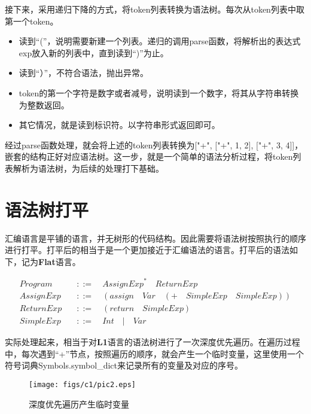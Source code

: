 接下来，采用递归下降的方式，将token列表转换为语法树。每次从token列表中取第一个token。
\begin{itemize}
  \item 读到“(”，说明需要新建一个列表。递归的调用parse函数，将解析出的表达式exp放入新的列表中，直到读到“)”为止。
  \item 读到“）”，不符合语法，抛出异常。
  \item token的第一个字符是数字或者减号，说明读到一个数字，将其从字符串转换为整数返回。
  \item 其它情况，就是读到标识符。以字符串形式返回即可。
\end{itemize}

经过parse函数处理，就会将上述的token列表转换为["+", ["+", 1, 2], ["+", 3, 4]]，嵌套的结构正好对应语法树。这一步，就是一个简单的语法分析过程，将token列表解析为语法树，为后续的处理打下基础。

\section{语法树打平}

汇编语言是平铺的语言，并无树形的代码结构。因此需要将语法树按照执行的顺序进行打平。打平后的相当于是一个更加接近于汇编语法的语言。打平后的语法如下，记为\textbf{Flat}语言。

\begin{equation}
\begin{aligned}
  \label{eq:3}
   Program \quad &::= \quad {AssignExp}^* \quad ReturnExp \\
   AssignExp \quad &::= \quad (assign \quad Var \quad (+ \quad SimpleExp \quad SimpleExp)) \\
   ReturnExp \quad &::= \quad (return \quad SimpleExp) \\
   SimpleExp \quad &::=  \quad Int \quad | \quad Var
\end{aligned}
\end{equation}

实际处理起来，相当于对\textbf{L1}语言的语法树进行了一次深度优先遍历。在遍历过程中，每次遇到“+”节点，按照遍历的顺序，就会产生一个临时变量，这里使用一个符号词典Symbols.symbol\_dict来记录所有的变量及对应的序号。

\begin{figure}[ht]
\centering
\texttt{[image: figs/c1/pic2.eps]}
\caption{深度优先遍历产生临时变量}
\label{fig:fig2}
\end{figure}


